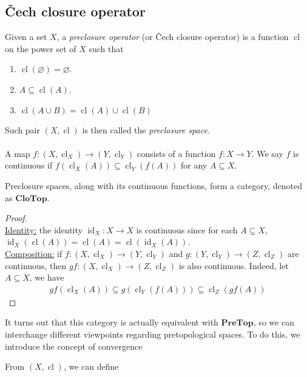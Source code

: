 \documentclass{treatise}
\begin{document}
\begin{shaded}
\subsection{Čech closure operator}
Given a set $X$, a \emph{preclosure operator} (or Čech closure operator) is a function $\operatorname{cl}$ on the power set of $X$ such that
\begin{enumerate}
    \item $\operatorname{cl}(\varnothing) = \varnothing$.
    \item $A \subseteq \operatorname{cl}(A)$.
    \item $\operatorname{cl}(A \cup B) = \operatorname{cl}(A) \cup \operatorname{cl}(B)$
\end{enumerate}
Such pair $(X, \operatorname{cl})$ is then called the \emph{preclosure space}.
\\
\\
A map $f: (X, \operatorname{cl}_X) \to (Y, \operatorname{cl}_Y)$ consists of a function $f: X \to Y$. We say $f$ is continuous if $f(\operatorname{cl}_X(A)) \subseteq \operatorname{cl}_Y(f(A))$ for any $A \subseteq X$.
\begin{proposition}
Preclosure spaces, along with its continuous functions, form a category, denoted as $\mathbf{CloTop}$.
\end{proposition}
\begin{proof} \ \\
\underline{Identity:} the identity $\operatorname{id}_X: X \to X$ is continuous since for each $A \subseteq X$, $\operatorname{id}_X (\operatorname{cl}(A)) = \operatorname{cl}(A) = \operatorname{cl}(\operatorname{id}_X(A))$.
\\
\underline{Composition:} if $f: (X, \operatorname{cl}_X) \to (Y, \operatorname{cl}_Y)$ and $g: (Y, \operatorname{cl}_Y) \to (Z, \operatorname{cl}_Z)$ are continuous, then $gf: (X, \operatorname{cl}_X) \to (Z, \operatorname{cl}_Z)$ is also continuous. Indeed, let $A \subseteq X$, we have
\begin{align*}
    gf(\operatorname{cl}_X(A)) \subseteq g(\operatorname{cl}_Y(f(A))) \subseteq \operatorname{cl}_Z(gf(A))
\end{align*}
\end{proof}
It turns out that this category is actually equivalent with $\mathbf{PreTop}$, so we can interchange different viewpoints regarding pretopological spaces. To do this, we introduce the concept of convergence
\begin{theorem}
From $(X, \operatorname{cl})$, we can define
\end{theorem}
\begin{corollary}

\end{corollary}
\end{shaded}
\end{document}
